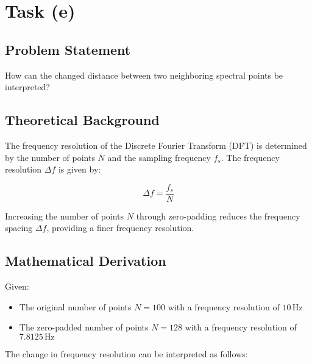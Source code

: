 \item[(e)]
\section*{Task (e)}

\subsection*{Problem Statement}
How can the changed distance between two neighboring spectral points be interpreted?

\subsection*{Theoretical Background}
The frequency resolution of the Discrete Fourier Transform (DFT) is determined by the number of points \( N \) and the sampling frequency \( f_s \). The frequency resolution \( \Delta f \) is given by:

\[ \Delta f = \frac{f_s}{N} \]

Increasing the number of points \( N \) through zero-padding reduces the frequency spacing \( \Delta f \), providing a finer frequency resolution.

\subsection*{Mathematical Derivation}
Given:
\begin{itemize}
    \item The original number of points \( N = 100 \) with a frequency resolution of \( 10 \, \text{Hz} \)
    \item The zero-padded number of points \( N = 128 \) with a frequency resolution of \( 7.8125 \, \text{Hz} \)
\end{itemize}

The change in frequency resolution can be interpreted as follows:

